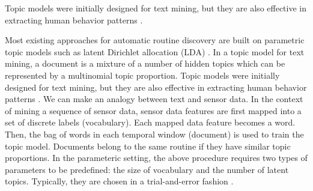 Topic models were initially designed for text mining, but they are
also effective in extracting human behavior patterns \cite{Huynh_2008,Farrahi_2011}.




Most existing approaches for automatic routine discovery
are built on parametric topic models such as latent Dirichlet
allocation (LDA) \cite{Blei_2003}. In a topic model for text mining, a
document is a mixture of a number of hidden topics which
can be represented by a multinomial topic proportion. Topic
models were initially designed for text mining, but they are
also effective in extracting human behavior patterns \cite{Huynh_2008, Farrahi_2011}.
We can make an analogy between text and sensor data.
In the context of mining a sequence of sensor data, sensor data features are first mapped into a set of discrete labels (vocabulary). 
Each mapped data feature becomes a word.
Then, the bag of words in each temporal window (document) is used to train the topic model. Documents belong to the same routine if 
they have similar topic proportions. In the parameteric setting, the above procedure requires two types of parameters to be predefined: 
the size of vocabulary and the number of latent topics. Typically, they are chosen in a trial-and-error fashion \cite{Huynh_2008,Farrahi_2011}.

